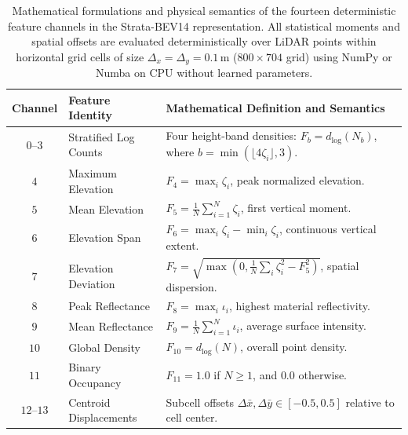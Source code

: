 \begin{table}[t]
    \caption{Mathematical formulations and physical semantics of the fourteen deterministic feature channels in the Strata-BEV14 representation. All statistical moments and spatial offsets are evaluated deterministically over LiDAR points within horizontal grid cells of size $\Delta_x = \Delta_y = 0.1\,\text{m}$ ($800 \times 704$ grid) using NumPy or Numba on CPU without learned parameters.}
    \label{tab:strata_bev14}
    \centering\small
    \setlength{\tabcolsep}{3pt}
    \begin{tabular}{@{}c >{\raggedright\arraybackslash}p{} >{\raggedright\arraybackslash}p{}@{}}
        \toprule
        \textbf{Channel} & \textbf{Feature Identity} & \textbf{Mathematical Definition and Semantics} \\
        \midrule
        $0$--$3$ & Stratified Log Counts & Four height-band densities: $F_b = d_{\log}(N_b)$, where $b = \min(\lfloor 4\zeta_i \rfloor, 3)$. \\
        $4$ & Maximum Elevation & $F_4 = \max_{i} \zeta_i$, peak normalized elevation. \\
        $5$ & Mean Elevation & $F_5 = \frac{1}{N} \sum_{i=1}^N \zeta_i$, first vertical moment. \\
        $6$ & Elevation Span & $F_6 = \max_{i} \zeta_i - \min_{i} \zeta_i$, continuous vertical extent. \\
        $7$ & Elevation Deviation & $F_7 = \sqrt{\max(0, \frac{1}{N} \sum_{i} \zeta_i^2 - F_5^2)}$, spatial dispersion. \\
        $8$ & Peak Reflectance & $F_8 = \max_{i} \iota_i$, highest material reflectivity. \\
        $9$ & Mean Reflectance & $F_9 = \frac{1}{N} \sum_{i=1}^N \iota_i$, average surface intensity. \\
        $10$ & Global Density & $F_{10} = d_{\log}(N)$, overall point density. \\
        $11$ & Binary Occupancy & $F_{11} = 1.0$ if $N \ge 1$, and $0.0$ otherwise. \\
        $12$--$13$ & Centroid Displacements & Subcell offsets $\Delta \bar{x}, \Delta \bar{y} \in [-0.5, 0.5]$ relative to cell center. \\
        \bottomrule
    \end{tabular}
\end{table}

